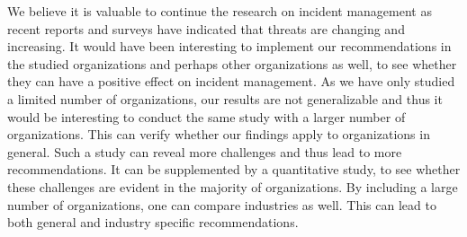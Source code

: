 We believe it is valuable to continue the research on incident management as recent reports and surveys have indicated that threats are changing and increasing. It would have been interesting to implement our recommendations in the studied organizations and perhaps other organizations as well, to see whether they can have a positive effect on incident management. As we have only studied a limited number of organizations, our results are not generalizable and thus it would be interesting to conduct the same study with a larger number of organizations. This can verify whether our findings apply to organizations in general. Such a study can reveal more challenges and thus lead to more recommendations. It can be supplemented by a quantitative study, to see whether these challenges are evident in the majority of organizations. By including a large number of organizations, one can compare industries as well. This can lead to both general and industry specific recommendations.
